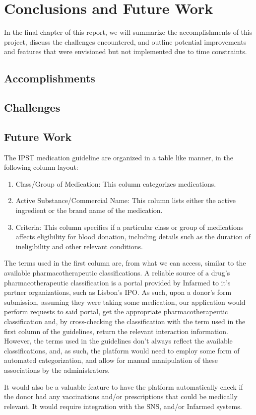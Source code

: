 \chapter{Conclusions and Future Work} \label{cap:future}
In the final chapter of this report, we will summarize the accomplishments of this project, discuss the challenges encountered, and outline potential improvements and features that were envisioned but not implemented due to time constraints.
\section{Accomplishments}

\section{Challenges}

\section{Future Work}
The IPST medication guideline are organized in a table like manner, in the following column layout:
\begin{enumerate}
	\item Class/Group of Medication: This column categorizes medications.
	\item Active Substance/Commercial Name: This column lists either the active ingredient or the brand name of the medication.
	\item Criteria: This column specifies if a particular class or group of medications affects eligibility for blood donation, including details such as the duration of ineligibility and other relevant conditions.
\end{enumerate}
The terms used in the first column are, from what we can access, similar to the available pharmacotherapeutic classifications. A reliable source of a drug's pharmacotherapeutic classification is a portal provided by Infarmed to it's partner organizations, such as Lisbon's IPO.
As such, upon a donor's form submission, assuming they were taking some medication, our application would perform requests to said portal, get the appropriate pharmacotherapeutic classification and, by cross-checking the classification with the term used in the first column of the guidelines, return the relevant interaction information.
However, the terms used in the guidelines don't always reflect the available classifications, and, as such, the platform would need to employ some form of automated categorization, and allow for manual manipulation of these associations by the administrators.

It would also be a valuable feature to have the platform automatically check if the donor had any vaccinations and/or prescriptions that could be medically relevant. It would require integration with the SNS, and/or Infarmed systems.
